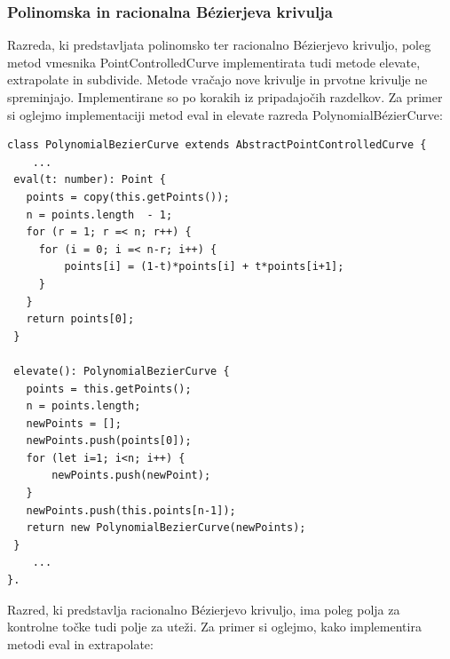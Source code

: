 \documentclass[isrm2, tisk]{fmfdelo}
\begin{document}
    \subsubsection*{Polinomska in racionalna Bézierjeva krivulja}
    Razreda, ki predstavljata polinomsko ter racionalno Bézierjevo krivuljo, poleg metod vmesnika PointControlledCurve implementirata tudi metode elevate, extrapolate in subdivide.
%
    Metode vračajo nove krivulje in prvotne krivulje ne spreminjajo.
    Implementirane so po korakih iz pripadajočih razdelkov.
    Za primer si oglejmo implementaciji metod eval in elevate razreda PolynomialBézierCurve:
    \begin{lstlisting}[label={lst:bez-curve}]
class PolynomialBezierCurve extends AbstractPointControlledCurve {
    ...
 eval(t: number): Point {
   points = copy(this.getPoints());
   n = points.length  - 1;
   for (r = 1; r =< n; r++) {
     for (i = 0; i =< n-r; i++) {
         points[i] = (1-t)*points[i] + t*points[i+1];
     }
   }
   return points[0];
 }

 elevate(): PolynomialBezierCurve {
   points = this.getPoints();
   n = points.length;
   newPoints = [];
   newPoints.push(points[0]);
   for (let i=1; i<n; i++) {
       newPoints.push(newPoint);
   }
   newPoints.push(this.points[n-1]);
   return new PolynomialBezierCurve(newPoints);
 }
    ...
}.
    \end{lstlisting}
    Razred, ki predstavlja racionalno Bézierjevo krivuljo, ima poleg polja za kontrolne točke tudi polje za uteži.
    Za primer si oglejmo, kako implementira metodi eval in extrapolate:
\end{document}
